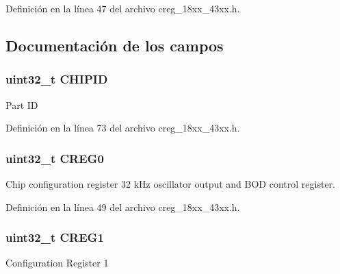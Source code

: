 Definición en la línea 47 del archivo creg\+\_\+18xx\+\_\+43xx.\+h.



\subsection{Documentación de los campos}
\subsubsection[{\texorpdfstring{C\+H\+I\+P\+ID}{CHIPID}}]{ uint32\+\_\+t C\+H\+I\+P\+ID}\hypertarget{struct_l_p_c___c_r_e_g___t_a83f27e33580bc34337075eb92e2a2537}{}\label{struct_l_p_c___c_r_e_g___t_a83f27e33580bc34337075eb92e2a2537}
Part ID 

Definición en la línea 73 del archivo creg\+\_\+18xx\+\_\+43xx.\+h.

\subsubsection[{\texorpdfstring{C\+R\+E\+G0}{CREG0}}]{ uint32\+\_\+t C\+R\+E\+G0}\hypertarget{struct_l_p_c___c_r_e_g___t_a2e846ad10e3f493297ed99747086ffb0}{}\label{struct_l_p_c___c_r_e_g___t_a2e846ad10e3f493297ed99747086ffb0}
Chip configuration register 32 k\+Hz oscillator output and B\+OD control register. 

Definición en la línea 49 del archivo creg\+\_\+18xx\+\_\+43xx.\+h.

\subsubsection[{\texorpdfstring{C\+R\+E\+G1}{CREG1}}]{ uint32\+\_\+t C\+R\+E\+G1}\hypertarget{struct_l_p_c___c_r_e_g___t_a7737f3d7015ff2d626ce7701a42e1f17}{}\label{struct_l_p_c___c_r_e_g___t_a7737f3d7015ff2d626ce7701a42e1f17}
Configuration Register 1 

